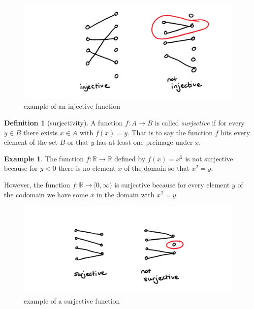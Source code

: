 \documentclass[
]{book}
\theoremstyle{definition}
\newtheorem{definition}{Definition}[chapter]
\theoremstyle{definition}
\newtheorem{example}{Example}[chapter]
\theoremstyle{definition}
\theoremstyle{definition}
\theoremstyle{remark}
\begin{document}
\begin{figure}
\centering
\includegraphics{injective.png}
\caption{\label{fig:unnamed-chunk-2}example of an injective function}
\end{figure}

\begin{definition}[surjectivity]
A function \(f: A \rightarrow B\) is called \emph{surjective} if for every \(y \in B\) there exists \(x \in A\) with \(f(x)=y\). That is to say the function \(f\) hits every element of the set \(B\) or that \(y\) has at least one preimage under \(x\).
\end{definition}

\begin{example}
The function \(f:\mathbb{R} \rightarrow \mathbb{R}\) defined by \(f(x) = x^2\) is not surjective because for \(y<0\) there is no element \(x\) of the domain so that \(x^2=y\).

However, the function \(f: \mathbb{R} \rightarrow [0,\infty)\) is surjective because for every element \(y\) of the codomain we have some \(x\) in the domain with \(x^2 =y\).
\end{example}

\begin{figure}
\centering
\includegraphics{surjective.png}
\caption{\label{fig:unnamed-chunk-3}example of a surjective function}
\end{figure}
\end{document}
